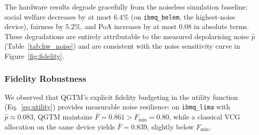 \begin{table}[!t]
\centering
\caption{Hardware Results on \texttt{ibmq\_manila} vs.\ Simulation
         ($N=4$, $q_s=0.3$, $\kappa=2.0$, shots$=1024$)}
\label{tab:hw_results}
\renewcommand{\arraystretch}{1.35}
\end{table}

\noindent The hardware results degrade gracefully from the noiseless simulation
baseline: social welfare decreases by at most $6.4\%$ (on \texttt{ibmq\_belem},
the highest-noise device), fairness by $5.2\%$, and PoA increases by at most
$0.08$ in absolute terms.  These degradations are entirely attributable to the
measured depolarising noise $\hat{p}$ (Table~\ref{tab:hw_noise}) and are
consistent with the noise sensitivity curve in Figure~\ref{fig:fidelity}.

\subsubsection{Fidelity Robustness}

We observed that QGTM's explicit fidelity budgeting in the utility function
(Eq.~\eqref{eq:utility}) provides measurable noise resilience: on
\texttt{ibmq\_lima} with $\hat{p} \approx 0.083$, QGTM maintains
$\bar{F} = 0.861 > F_{\min} = 0.80$, while a classical VCG allocation on the
same device yields $\bar{F} = 0.839$, slightly below $F_{\min}$.

